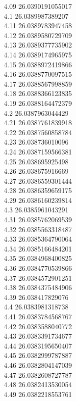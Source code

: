 {4.09	26.0390191055017\\
4.1	26.0389987389207\\
4.11	26.0389783947458\\
4.12	26.0389580729709\\
4.13	26.0389377735902\\
4.14	26.0389174965975\\
4.15	26.0388972419866\\
4.16	26.0388770097515\\
4.17	26.0388567998859\\
4.18	26.0388366123835\\
4.19	26.0388164472379\\
4.2	26.0387963044429\\
4.21	26.0387761839918\\
4.22	26.0387560858784\\
4.23	26.038736010096\\
4.24	26.0387159566381\\
4.25	26.038695925498\\
4.26	26.038675916669\\
4.27	26.0386559301444\\
4.28	26.0386359659175\\
4.29	26.0386160239814\\
4.3	26.0385961043291\\
4.31	26.0385762069539\\
4.32	26.0385563318487\\
4.33	26.0385364790064\\
4.34	26.0385166484201\\
4.35	26.0384968400825\\
4.36	26.0384770539866\\
4.37	26.0384572901251\\
4.38	26.0384375484906\\
4.39	26.038417829076\\
4.4	26.0383981318738\\
4.41	26.0383784568767\\
4.42	26.0383588040772\\
4.43	26.0383391734677\\
4.44	26.0383195650407\\
4.45	26.0382999787887\\
4.46	26.0382804147039\\
4.47	26.0382608727787\\
4.48	26.0382413530054\\
4.49	26.0382218553761\\
}

